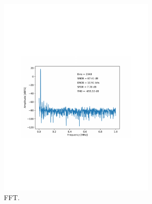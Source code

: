 \label{sec:4.3}


\begin{figure}[htb]
\centering
\begin{center}
\includegraphics[width=0.7\textwidth]{figures/fft_Sinusoid_20KHz_SE-SHA-ADC0_NomVREFPN_2M_v1.pdf}
\end{center}
\caption{FFT.}
\label{fig:coldadc_fft}
\end{figure}



